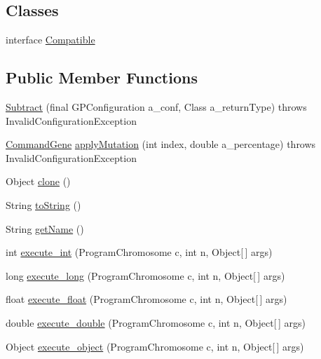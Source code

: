 \subsection*{Classes}
\begin{DoxyCompactItemize}
\item 
interface \hyperlink{interfaceorg_1_1jgap_1_1gp_1_1function_1_1_subtract_1_1_compatible}{Compatible}
\end{DoxyCompactItemize}
\subsection*{Public Member Functions}
\begin{DoxyCompactItemize}
\item 
\hyperlink{classorg_1_1jgap_1_1gp_1_1function_1_1_subtract_ac580e76bc3d966fd12f536f6eaff1ba6}{Subtract} (final G\-P\-Configuration a\-\_\-conf, Class a\-\_\-return\-Type)  throws Invalid\-Configuration\-Exception 
\item 
\hyperlink{classorg_1_1jgap_1_1gp_1_1_command_gene}{Command\-Gene} \hyperlink{classorg_1_1jgap_1_1gp_1_1function_1_1_subtract_a0750c586ef847b65beacff4ec4da3657}{apply\-Mutation} (int index, double a\-\_\-percentage)  throws Invalid\-Configuration\-Exception 
\item 
Object \hyperlink{classorg_1_1jgap_1_1gp_1_1function_1_1_subtract_aef329c4ac4462f708cade81b259195e0}{clone} ()
\item 
String \hyperlink{classorg_1_1jgap_1_1gp_1_1function_1_1_subtract_a4a44614947717c5ee7e88f943bfc9454}{to\-String} ()
\item 
String \hyperlink{classorg_1_1jgap_1_1gp_1_1function_1_1_subtract_aabb9c95fab9a9d12a35b3627d10fb7e1}{get\-Name} ()
\item 
int \hyperlink{classorg_1_1jgap_1_1gp_1_1function_1_1_subtract_ae9a34be5da0f1b64688106c60c33a2ce}{execute\-\_\-int} (Program\-Chromosome c, int n, Object\mbox{[}$\,$\mbox{]} args)
\item 
long \hyperlink{classorg_1_1jgap_1_1gp_1_1function_1_1_subtract_a1d9ee5465d10d9f29ef0c1dd9f605a07}{execute\-\_\-long} (Program\-Chromosome c, int n, Object\mbox{[}$\,$\mbox{]} args)
\item 
float \hyperlink{classorg_1_1jgap_1_1gp_1_1function_1_1_subtract_ae358fb8f2afcbdc1d5bdf5385a371717}{execute\-\_\-float} (Program\-Chromosome c, int n, Object\mbox{[}$\,$\mbox{]} args)
\item 
double \hyperlink{classorg_1_1jgap_1_1gp_1_1function_1_1_subtract_a441f2cef251164ec7951bcdfd1974ddc}{execute\-\_\-double} (Program\-Chromosome c, int n, Object\mbox{[}$\,$\mbox{]} args)
\item 
Object \hyperlink{classorg_1_1jgap_1_1gp_1_1function_1_1_subtract_a0ec00311a00bdf20e77940ebac3a3d6d}{execute\-\_\-object} (Program\-Chromosome c, int n, Object\mbox{[}$\,$\mbox{]} args)
\end{DoxyCompactItemize}
